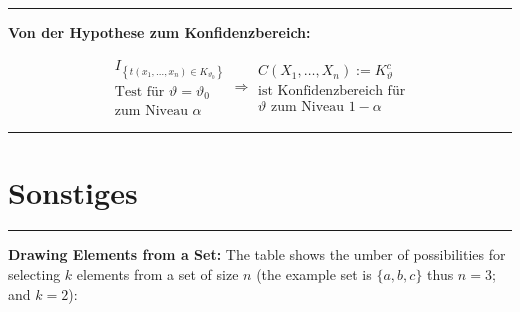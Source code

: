 \documentclass[a4paper, 12pt]{extarticle}
\newcommand{\sep}{\vspace{5pt}\noindent\hrule\vspace{5pt}}
\newcommand{\set}[1]{\left\{ #1 \right\}}
\begin{document}
\begin{multicols*}{2}
\sep

\textbf{Von der Hypothese zum Konfidenzbereich:}

\[
\begin{matrix}
I_{\set{t(x_1,\ldots,x_n) \in K_{\vartheta_0}}}\\
\text{Test für }\vartheta=\vartheta_0\\
\text{zum Niveau }\alpha
\end{matrix}
\Longrightarrow
\begin{matrix}
C(X_1,\ldots,X_n):=K_\vartheta ^c\\
\text{ist Konfidenzbereich für}\\
\vartheta \text{ zum Niveau } 1-\alpha
\end{matrix}
\]

\sep

\section{Sonstiges}

\sep

\textbf{Drawing Elements from a Set:} The table shows the umber of possibilities
for selecting $k$ elements from a set of size $n$ (the example set is
$\{a,b,c\}$ thus $n=3$; and $k=2$):


\end{multicols*}
\end{document}
